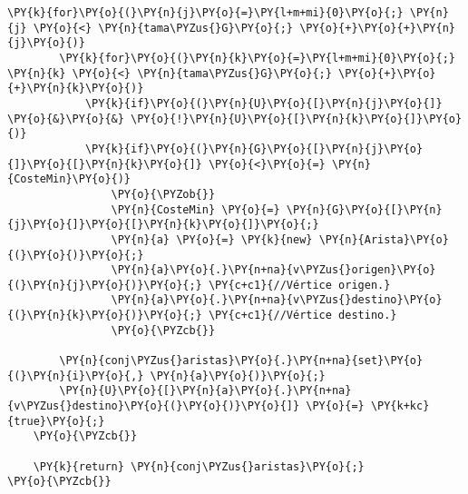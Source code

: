 \begin{Verbatim}[commandchars=\\\{\}]
	    \PY{k}{for}\PY{o}{(}\PY{n}{j}\PY{o}{=}\PY{l+m+mi}{0}\PY{o}{;} \PY{n}{j} \PY{o}{<} \PY{n}{tama\PYZus{}G}\PY{o}{;} \PY{o}{+}\PY{o}{+}\PY{n}{j}\PY{o}{)}
		\PY{k}{for}\PY{o}{(}\PY{n}{k}\PY{o}{=}\PY{l+m+mi}{0}\PY{o}{;} \PY{n}{k} \PY{o}{<} \PY{n}{tama\PYZus{}G}\PY{o}{;} \PY{o}{+}\PY{o}{+}\PY{n}{k}\PY{o}{)}
		    \PY{k}{if}\PY{o}{(}\PY{n}{U}\PY{o}{[}\PY{n}{j}\PY{o}{]} \PY{o}{&}\PY{o}{&} \PY{o}{!}\PY{n}{U}\PY{o}{[}\PY{n}{k}\PY{o}{]}\PY{o}{)}
			\PY{k}{if}\PY{o}{(}\PY{n}{G}\PY{o}{[}\PY{n}{j}\PY{o}{]}\PY{o}{[}\PY{n}{k}\PY{o}{]} \PY{o}{<}\PY{o}{=} \PY{n}{CosteMin}\PY{o}{)}
			    \PY{o}{\PYZob{}}
				\PY{n}{CosteMin} \PY{o}{=} \PY{n}{G}\PY{o}{[}\PY{n}{j}\PY{o}{]}\PY{o}{[}\PY{n}{k}\PY{o}{]}\PY{o}{;}
				\PY{n}{a} \PY{o}{=} \PY{k}{new} \PY{n}{Arista}\PY{o}{(}\PY{o}{)}\PY{o}{;}
				\PY{n}{a}\PY{o}{.}\PY{n+na}{v\PYZus{}origen}\PY{o}{(}\PY{n}{j}\PY{o}{)}\PY{o}{;} \PY{c+c1}{//Vértice origen.}
				\PY{n}{a}\PY{o}{.}\PY{n+na}{v\PYZus{}destino}\PY{o}{(}\PY{n}{k}\PY{o}{)}\PY{o}{;} \PY{c+c1}{//Vértice destino.}
			    \PY{o}{\PYZcb{}}

	    \PY{n}{conj\PYZus{}aristas}\PY{o}{.}\PY{n+na}{set}\PY{o}{(}\PY{n}{i}\PY{o}{,} \PY{n}{a}\PY{o}{)}\PY{o}{;}
	    \PY{n}{U}\PY{o}{[}\PY{n}{a}\PY{o}{.}\PY{n+na}{v\PYZus{}destino}\PY{o}{(}\PY{o}{)}\PY{o}{]} \PY{o}{=} \PY{k+kc}{true}\PY{o}{;}
	\PY{o}{\PYZcb{}}

    \PY{k}{return} \PY{n}{conj\PYZus{}aristas}\PY{o}{;}
\PY{o}{\PYZcb{}}
\end{Verbatim}
